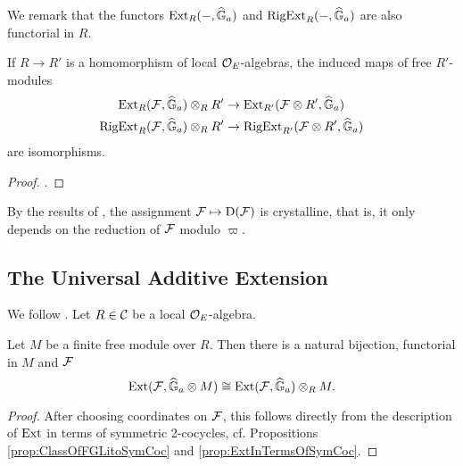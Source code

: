 \documentclass[../main.tex]{subfiles}
\begin{document}
We remark that the functors $\operatorname{Ext}_R(-,\widehat{\mathbb{G}}_a)$ and $\operatorname {RigExt}_R(-,\widehat{\mathbb{G}}_a)$ are
also functorial in $R$.
\begin{lem}
  If $R \to R'$ is a homomorphism of local ${\mathcal{O}_E}$-algebras, the induced maps 
  of free $R'$-modules
  \begin{gather*}
    \operatorname{Ext}_R(\mathcal{F}, \widehat{\mathbb{G}}_a) \otimes_R R' \to \operatorname{Ext}_{R'}(\mathcal{F} \otimes R', \widehat{\mathbb{G}}_a) \\
    \operatorname {RigExt}_R(\mathcal{F}, \widehat{\mathbb{G}}_a) \otimes_R R' \to \operatorname {RigExt}_{R'}(\mathcal{F} \otimes R', \widehat{\mathbb{G}}_a)
  \end{gather*}
  are isomorphisms.
\begin{proof}
  \cite[Corollary 9.13]{hopkins1994equivariant}.
\end{proof}
\end{lem}

By the results of \cite{de1995crystalline}, the assignment
$\mathcal{F} \mapsto \mathrm{D}(\mathcal{F})$ is crystalline, that is, it only
depends on the reduction of $\mathcal{F}$ modulo $\varpi$. 


\subsection{The Universal Additive Extension} %
\label{sub:The Universal Additive Extension}
We follow \cite[Section 11]{hopkins1994equivariant}.
Let $R \in \mathcal{C}$ be a local $\mathcal{O}_E$-algebra.

\begin{lem}
  Let $M$ be a finite free module over $R$. Then there is a natural bijection,
  functorial in $M$ and $\mathcal{F}$
  \begin{equation*}
    \operatorname{Ext}(\mathcal{F}, \widehat{\mathbb{G}}_a \otimes M) \cong \operatorname{Ext}(\mathcal{F}, \widehat{\mathbb{G}}_a) \otimes_R M.
  \end{equation*}
\begin{proof}
  After choosing coordinates on $\mathcal{F}$, this follows directly from the 
  description of $\operatorname{Ext}$ in terms of symmetric 2-cocycles, cf. Propositions
  \ref{prop:ClassOfFGLitoSymCoc} and \ref{prop:ExtInTermsOfSymCoc}.
\end{proof}
\end{lem}
\end{document}
